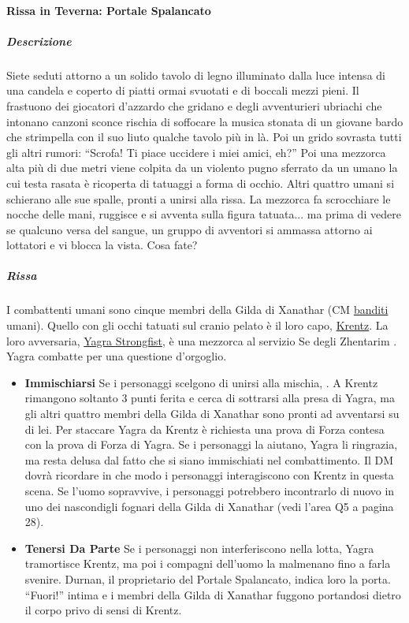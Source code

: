 \documentclass{article}
\begin{document}
\paragraph{Rissa in Teverna: Portale Spalancato}
\subparagraph{Descrizione}Siete seduti attorno a un solido tavolo di legno illuminato
dalla luce intensa di una candela e coperto di piatti
ormai svuotati e di boccali mezzi pieni. Il frastuono
dei giocatori d'azzardo che gridano e degli avventurieri
ubriachi che intonano canzoni sconce rischia di soffocare
la musica stonata di un giovane bardo che strimpella con
il suo liuto qualche tavolo più in là.
Poi un grido sovrasta tutti gli altri rumori: “Scrofa! Ti
piace uccidere i miei amici, eh?” Poi una mezzorca alta più
di due metri viene colpita da un violento pugno sferrato
da un umano la cui testa rasata è ricoperta di tatuaggi
a forma di occhio. Altri quattro umani si schierano alle
sue spalle, pronti a unirsi alla rissa. La mezzorca fa
scrocchiare le nocche delle mani, ruggisce e si avventa
sulla figura tatuata... ma prima di vedere se qualcuno
versa del sangue, un gruppo di avventori si ammassa
attorno ai lottatori e vi blocca la vista. Cosa fate?

\subparagraph{Rissa}I combattenti umani sono cinque membri della Gilda
di Xanathar (CM \hyperlink{banditi}{banditi} umani). Quello con gli occhi
tatuati sul cranio pelato è il loro capo, \hyperlink{krent}{ Krentz}. La loro
avversaria, \hyperlink{yagra}{Yagra Strongfist}, è una mezzorca al servizio Se
degli Zhentarim . Yagra combatte per una
questione d'orgoglio.

\begin{itemize}
    \item \textbf{Immischiarsi} Se i personaggi scelgono di unirsi alla mischia, . A Krentz rimangono soltanto 3 punti ferita
e cerca di sottrarsi alla presa di Yagra, ma gli altri quattro
membri della Gilda di Xanathar sono pronti ad avventarsi
su di lei.
Per staccare Yagra da Krentz è richiesta una prova
di Forza contesa con la prova di Forza di Yagra. Se i
personaggi la aiutano, Yagra li ringrazia, ma resta delusa
dal fatto che si siano immischiati nel combattimento.
Il DM dovrà ricordare in che modo i personaggi
interagiscono con Krentz in questa scena. Se l’uomo
sopravvive, i personaggi potrebbero incontrarlo di nuovo
in uno dei nascondigli fognari della Gilda di Xanathar (vedi
l’area Q5 a pagina 28).
\item \textbf{Tenersi Da Parte} Se i personaggi non interferiscono nella lotta, Yagra
tramortisce Krentz, ma poi i compagni dell’uomo la
malmenano fino a farla svenire. Durnan, il proprietario del
Portale Spalancato, indica loro la porta. “Fuori!” intima e i
membri della Gilda di Xanathar fuggono portandosi dietro
il corpo privo di sensi di Krentz.

\end{itemize}
\end{document}
